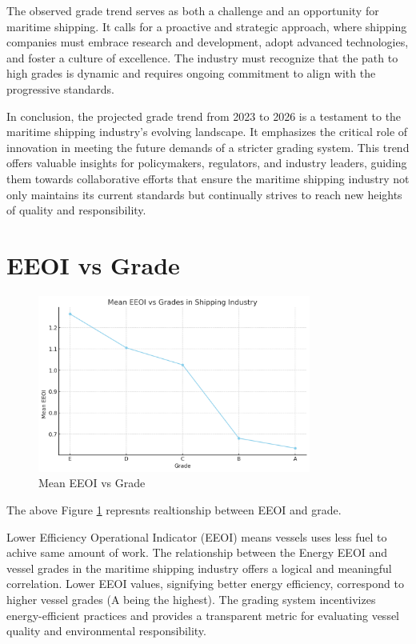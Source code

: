 The observed grade trend serves as both a challenge and an opportunity for maritime shipping. 
It calls for a proactive and strategic approach, where shipping companies must embrace research and development, adopt advanced technologies, and foster a culture of excellence. 
The industry must recognize that the path to high grades is dynamic and requires ongoing commitment to align with the progressive standards.

In conclusion, the projected grade trend from 2023 to 2026 is a testament to the maritime shipping industry's evolving landscape. 
It emphasizes the critical role of innovation in meeting the future demands of a stricter grading system. 
This trend offers valuable insights for policymakers, regulators, and industry leaders, guiding them towards collaborative efforts that ensure the maritime shipping industry not only maintains its current standards but continually strives to reach new heights of quality and responsibility.

\section{EEOI vs Grade}

\begin{figure}[h]
    \centering
    \includegraphics[width=0.8\textwidth]{images/eeoi_grade.png}
    \caption{Mean EEOI vs Grade}
    \label{eeoi_grade}
\end{figure}

The above Figure \ref{eeoi_grade} represnts realtionship between EEOI and grade.

Lower Efficiency Operational Indicator (EEOI) means vessels uses less fuel to achive same amount of work.
The relationship between the Energy EEOI and vessel grades in the maritime shipping industry offers a logical and meaningful correlation. 
Lower EEOI values, signifying better energy efficiency, correspond to higher vessel grades (A being the highest). 
The grading system incentivizes energy-efficient practices and provides a transparent metric for evaluating vessel quality and environmental responsibility.

